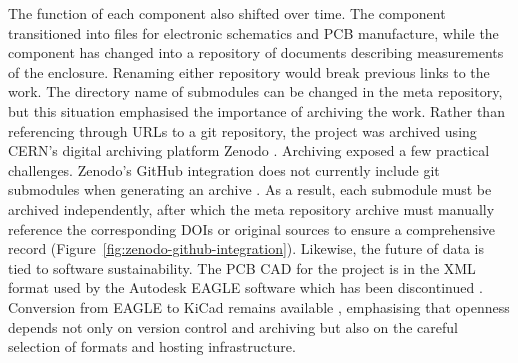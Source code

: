 The function of each component also shifted over time. The  component transitioned into files for electronic schematics and PCB manufacture, while the  component has changed into a repository of documents describing measurements of the enclosure. 
Renaming either repository would break previous links to the work. The directory name of submodules can be changed in the meta repository, but this situation emphasised the importance of archiving the work.
Rather than referencing through URLs to a git repository, the project was archived using CERN's digital archiving platform Zenodo \cite{zenodo_2013}.
Archiving exposed a few practical challenges.
Zenodo’s GitHub integration does not currently include git submodules when generating an archive \cite{zenodo_1036_2025}. As a result, each submodule must be archived independently, after which the meta repository archive must manually reference the corresponding DOIs or original sources to ensure a comprehensive record (Figure~\ref{fig:zenodo-github-integration}).
Likewise, the future of data is tied to software sustainability. 
The PCB CAD for the project is in the XML format used  by the Autodesk EAGLE software which has been discontinued \cite{autodesk_eagle_2024}. 
Conversion from EAGLE to KiCad remains available \cite{kicad_eagle_2024}, emphasising that openness depends not only on version control and archiving but also on the careful selection of formats and hosting infrastructure.



